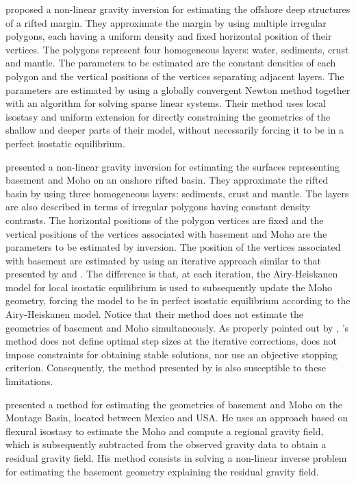\documentclass[manuscript]{geophysics}
\begin{document}
\citet{condi-etal1999} proposed a non-linear gravity inversion for estimating the
offshore deep structures of a rifted margin.
They approximate the margin by using multiple irregular polygons, each having a 
uniform density and fixed horizontal position of their vertices.
The polygons represent four homogeneous layers: water, sediments, crust and mantle.
The parameters to be estimated are the constant densities of each polygon and 
the vertical positions of the vertices separating adjacent layers.
The parameters are estimated by using a globally convergent Newton method
together with an algorithm for solving sparse linear systems.
Their method uses local isostasy and uniform extension for directly constraining the 
geometries of the shallow and deeper parts of their model, without necessarily
forcing it to be in a perfect isostatic equilibrium.

\citet{salem-etal2014} presented a non-linear gravity inversion for estimating the 
surfaces representing basement and Moho on an onshore rifted basin. 
They approximate the rifted basin by using three homogeneous layers: sediments, crust and mantle.
The layers are also described in terms of irregular polygons having constant density
contrasts.
The horizontal positions of the polygon vertices are fixed and the vertical positions
of the vertices associated with basement and Moho are the parameters to be estimated by 
inversion.
The position of the vertices associated with basement are estimated 
by using an iterative approach similar to that
presented by \citet{bott1960} and \citet{cordell-henderson1968}. 
The difference is that, at each iteration, the Airy-Heiskanen model
\citep[][$\,$ p. 135]{heiskanen-moritz1967} for local isostatic equilibrium is used 
to subsequently update the Moho geometry, forcing the model to be in
perfect isostatic equilibrium according to the Airy-Heiskanen model.
Notice that their method does not estimate the geometries of basement and Moho 
simultaneously.
As properly pointed out by \citet{silva-etal2014}, \citeauthor{bott1960}'s
method does not define optimal step sizes at the iterative corrections,
does not impose constraints for obtaining stable solutions, nor use
an objective stopping criterion. 
Consequently, the method presented by \citet{salem-etal2014} is also susceptible 
to these limitations.

\citet{garcia-abdeslem2017} presented a method for estimating the 
geometries of basement and Moho on the Montage Basin, located between Mexico and USA.
He uses an approach based on flexural isostasy to estimate the Moho and compute 
a regional gravity field, which is subsequently subtracted from the observed gravity 
data to obtain a residual gravity field. 
His method consists in solving a non-linear inverse problem for estimating the
basement geometry explaining the residual gravity field.
\end{document}
